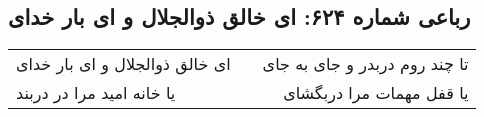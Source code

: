 \begin{center}
\section*{رباعی شماره ۶۲۴: ای خالق ذوالجلال و ای بار خدای}
\label{sec:sh624}
\begin{longtable}{l p{0.5cm} r}
ای خالق ذوالجلال و ای بار خدای
&&
تا چند روم دربدر و جای به جای
\\
یا خانه امید مرا در دربند
&&
یا قفل مهمات مرا دربگشای
\\
\end{longtable}
\end{center}
